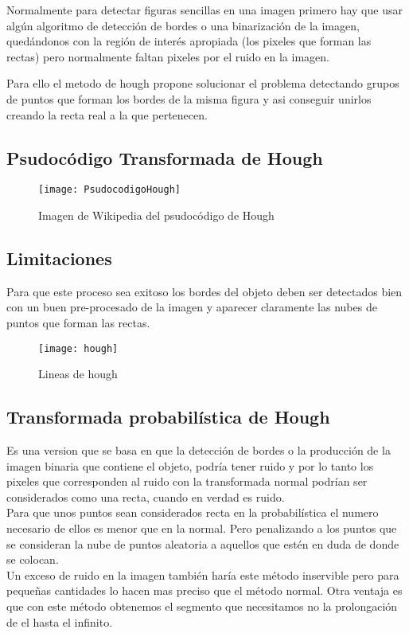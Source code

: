 Normalmente para detectar figuras sencillas en una imagen primero hay que usar algún algoritmo de detección de bordes o una binarización de la imagen, quedándonos con la región de interés apropiada (los pixeles que forman las rectas) pero normalmente faltan pixeles por el ruido en la imagen.

Para ello el metodo de hough propone solucionar el problema detectando grupos de puntos que forman los bordes de la misma figura y asi conseguir unirlos creando la recta real a la que pertenecen.

\subsection{Psudocódigo \cite{wiki:hough} Transformada de Hough}
\begin{figure}[h]
\centering
\texttt{[image: PsudocodigoHough]}
\caption{Imagen de Wikipedia del psudocódigo de Hough}
\end{figure}

\subsection{Limitaciones}
Para que este proceso sea exitoso los bordes del objeto deben ser detectados bien con un buen pre-procesado de la imagen y aparecer claramente las nubes de puntos que forman las rectas.

\begin{figure}[h]
\centering
\texttt{[image: hough]}
\caption{Lineas de hough}
\end{figure}

\subsection{Transformada probabilística  \cite{Kiryati20001157} de Hough}
Es una version que se basa en que la detección de bordes o la producción de la imagen binaria que contiene el objeto, podría tener ruido y por lo tanto los pixeles que corresponden al ruido con la transformada normal podrían ser considerados como una recta, cuando en verdad es ruido.\\
Para que unos puntos sean considerados recta en la probabilística el numero necesario de ellos es menor que en la normal. Pero penalizando a los puntos que se consideran la nube de puntos aleatoria a aquellos que estén en duda de donde se colocan.\\
Un exceso de ruido en la imagen también haría este método inservible pero para pequeñas cantidades lo hacen mas preciso que el método normal.
Otra ventaja es que con este método obtenemos el segmento que necesitamos no la prolongación de el hasta el infinito.


